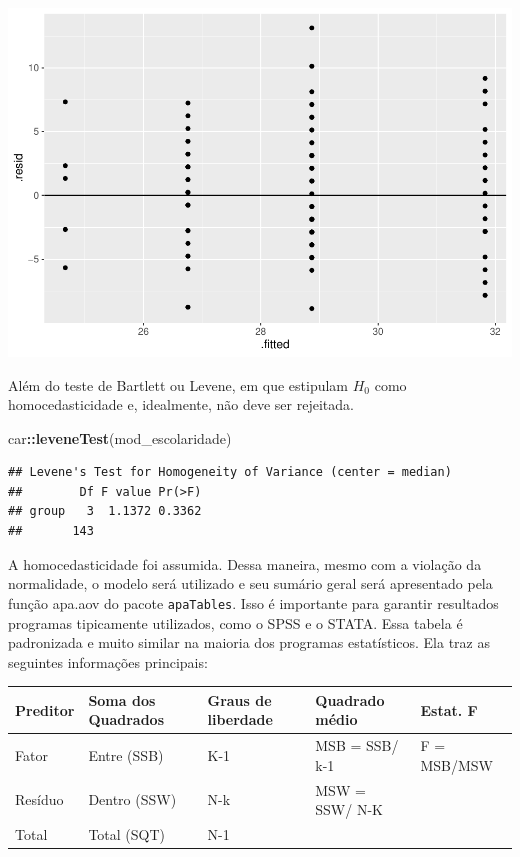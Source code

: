 \documentclass[
]{book}
\newenvironment{Shaded}{\begin{snugshade}}{\end{snugshade}}
\newcommand{\KeywordTok}[1]{\textcolor[rgb]{0.13,0.29,0.53}{\textbf{#1}}}
\newcommand{\NormalTok}[1]{#1}
\newcommand{\OperatorTok}[1]{\textcolor[rgb]{0.81,0.36,0.00}{\textbf{#1}}}
\begin{document}
\begin{center}\includegraphics{gitbook-demo_files/figure-latex/unnamed-chunk-56-1} \end{center}

Além do teste de Bartlett ou Levene, em que estipulam \(H_0\) como homocedasticidade e, idealmente, não deve ser rejeitada.

\begin{Shaded}
\begin{Highlighting}[]
\NormalTok{car}\OperatorTok{::}\KeywordTok{leveneTest}\NormalTok{(mod_escolaridade)}
\end{Highlighting}
\end{Shaded}

\begin{verbatim}
## Levene's Test for Homogeneity of Variance (center = median)
##        Df F value Pr(>F)
## group   3  1.1372 0.3362
##       143
\end{verbatim}

A homocedasticidade foi assumida. Dessa maneira, mesmo com a violação da normalidade, o modelo será utilizado e seu sumário geral será apresentado pela função apa.aov do pacote \texttt{apaTables}. Isso é importante para garantir resultados programas tipicamente utilizados, como o SPSS e o STATA. Essa tabela é padronizada e muito similar na maioria dos programas estatísticos. Ela traz as seguintes informações principais:

\begin{longtable}[]{@{}lllll@{}}
\toprule
Preditor & Soma dos Quadrados & Graus de liberdade & Quadrado médio & Estat. F\tabularnewline
\midrule
\endhead
Fator & Entre (SSB) & K-1 & MSB = SSB/ k-1 & F = MSB/MSW\tabularnewline
Resíduo & Dentro (SSW) & N-k & MSW = SSW/ N-K &\tabularnewline
Total & Total (SQT) & N-1 & &\tabularnewline
\bottomrule
\end{longtable}
\end{document}
